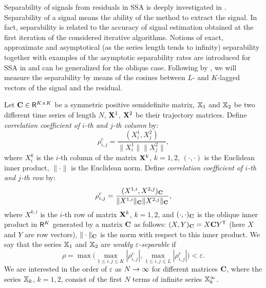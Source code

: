 \documentclass[sii]{ipart}
\begin{document}
Separability of signals from residuals in SSA is deeply investigated in \cite{Golyandina.etal2001,Golyandina2010}. Separability of a signal means the ability of the method to extract the signal. In fact, separability is related to the accuracy of signal estimation obtained at the first iteration
of the considered iterative algorithms. Notions of exact, approximate and asymptotical (as the series length tends to infinity) separability together with examples of the asymptotic separability rates are introduced for
SSA in \cite{Golyandina.etal2001} and can be generalized for the oblique case. Following by \cite{Golyandina.etal2001}, we will measure the separability by means of the cosines between $L$- and $K$-lagged vectors
of the signal and the residual.


Let $\mathbf{C} \in \mathsf{R}^{K \times K}$ be a symmetric positive semidefinite matrix, $\mathbb{X}_1$ and $\mathbb{X}_2$ be two different time series of length $N$, $\mathbf{X}^1$, $\mathbf{X}^2$ be their trajectory matrices. Define \emph{correlation coefficient of $i$-th and $j$-th column} by:
\begin{equation}\label{col_corr}
\rho^c_{i,j} = \frac{(X^1_i, X^2_j)}{\|X^1_i\| \|X^2_j\|},
\end{equation}
where $X^k_i$ is the $i$-th column of the matrix $\mathbf{X}^k$, $k = 1, 2$, $(\cdot, \cdot)$ is the Euclidean inner product, $\|\cdot\|$ is the Euclidean norm. Define \emph{correlation coefficient of $i$-th and $j$-th row} by:
\begin{equation}\label{row_corr}
\rho^r_{i,j} = \frac{(X^{1,i}, X^{2,j})_\bfC}{\|X^{1,i}\|_\bfC \|X^{2,j}\|_\bfC},
\end{equation}
where $X^{k,i}$ is the $i$-th row of matrix $\mathbf{X}^k$, $k = 1, 2$, and $(\cdot, \cdot)_{\mathbf{C}}$ is the oblique inner product in $\mathsf{R}^K$ generated by a matrix $\mathbf{C}$ as follows: $(X, Y)_{\mathbf{C}} = X \mathbf{C} Y^{\mathsf{T}}$ (here $X$ and $Y$ are row vectors), $\| \cdot \|_{\mathbf{C}}$ is the norm with respect to this inner product. We say that the series $\mathbb{X}_1$ and $\mathbb{X}_2$ are \emph{weakly $\varepsilon$-separable} if
\begin{equation}\label{weak_sep_eq}
\rho = \max\Big(\max_{1 \le i,j \le K}|\rho^c_{i,j}|, \max_{1 \le i,j \le L}|\rho^r_{i,j}|\Big) < \varepsilon.
\end{equation}
We are interested in the order of $\varepsilon$ as $N\rightarrow \infty$ for different matrices $\mathbf{C}$, where the series $\mathbb{X}_k$, $k=1,2$, consist of the first $N$ terms of infinite series $\mathbb{X}_k^\infty$.
\end{document}
